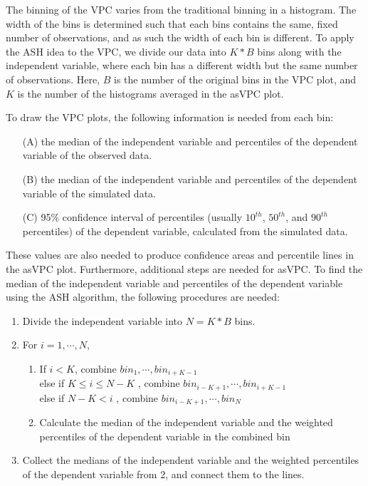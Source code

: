 
The binning of the VPC varies from the traditional binning in a histogram. The width of the bins is determined such that each bins contains the same, fixed number of observations, and as such the width of each bin is different. To apply the ASH idea to the VPC, we divide our data into $K*B$ bins along with the independent variable, where each bin has a different width but the same number of observations. Here, $B$ is the number of the original bins in the VPC plot, and $K$ is the number of the histograms averaged in the asVPC plot.


To draw the VPC plots, the following information is needed from each bin:

\begin{itemize}
\item[(A)] the median of the independent variable and percentiles of the dependent variable of the observed data.
\item[(B)] the median of the independent variable and percentiles of the dependent variable of the simulated data.
\item[(C)] 95$\%$ confidence interval of percentiles (usually $10^{th}$, $50^{th}$, and $90^{th}$ percentiles) of the dependent variable, calculated from the simulated data.
\end{itemize}

These values are also needed to produce confidence areas and percentile lines in the asVPC plot. Furthermore, additional steps are needed for asVPC. To find the median of the independent variable and percentiles of the dependent variable using the ASH algorithm, the following procedures are needed:

\begin{enumerate}
\item Divide the independent variable into $N=K*B$ bins.
\item For $i = 1, \cdots, N$,
\begin{enumerate}
\item If $i < K$, combine $bin_1, \cdots, bin_{i+K-1}$\\
else if  $K\le i\le N-K$ , combine  $bin_{i-K+1}, \cdots, bin_{i+K-1}$\\
else if  $N-K < i$ , combine $bin_{i-K+1}, \cdots, bin_N$
\item Calculate the median of the independent variable and the weighted percentiles of the dependent variable in the combined bin
 \end{enumerate}
\item Collect the medians of the independent variable and the weighted percentiles of the dependent variable from 2, and connect them to the lines.
\end{enumerate}

